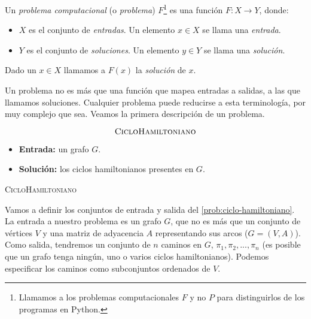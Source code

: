 \begin{definicion}\label{def:problema-computacional}
Un \emph{problema computacional} (o \emph{problema}) $F$\footnote{Llamamos a los problemas computacionales $F$ y no $P$ para distinguirlos de los programas en Python.} es una función $F:X \longrightarrow Y$, donde:
\begin{itemize}
    \item $X$ es el conjunto de \emph{entradas}. Un elemento $x\in X$ se llama una \emph{entrada}.
    \item $Y$ es el conjunto de \emph{soluciones}. Un elemento $y\in Y$ se llama una \emph{solución}.
\end{itemize}

Dado un $x\in X$ llamamos a $F(x)$ la \emph{solución} de $x$.
\end{definicion}

Un problema no es más que una función que mapea entradas a salidas, a las que llamamos soluciones. Cualquier problema puede reducirse a esta terminología, por muy complejo que sea. Veamos la primera descripción de un problema.

\begin{problema}
\begin{framed}
$$\text{\textsc{CicloHamiltoniano}}$$

\begin{itemize}
    \item \textbf{Entrada:} un grafo $G$.
    \item \textbf{Solución:} los ciclos hamiltonianos presentes en $G$.
\end{itemize}
\end{framed}
\caption{\textsc{CicloHamiltoniano}}
\label{prob:ciclo-hamiltoniano}
\end{problema}

Vamos a definir los conjuntos de entrada y salida del \cref{prob:ciclo-hamiltoniano}. La entrada a nuestro problema es un grafo $G$, que no es más que un conjunto de vértices $V$ y una matriz de adyacencia $A$ representando sus arcos ($G=(V,A)$). Como salida, tendremos un conjunto de $n$ caminos en $G$, $\pi_1,\pi_2,...,\pi_n$ (es posible que un grafo tenga ningún, uno o varios ciclos hamiltonianos). Podemos especificar los caminos como subconjuntos ordenados de $V$.

